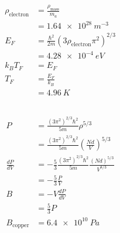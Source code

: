 \documentclass{article}
\begin{document}
\begin{align*}
  \rho_\text{electron} & = \frac{\rho_\text{mass}}{m_a}                               \\
                       & = \qty{1.64e28}{m^{-3}}                                      \\
  E_F                  & = \frac{\hbar^2}{2 m} (3 \rho_\text{electron} \pi^2)^{2 / 3} \\
                       & = \qty{4.28e-4}{eV}                                          \\
  k_B T_F              & = E_F                                                        \\
  T_F                  & = \frac{E_F}{k_B}                                            \\
                       & = \qty{4.96}{K}
\end{align*}

\subsection{}

\begin{align*}
  P               & = \frac{(3 \pi^2)^{2 / 3} \hbar^2}{5 m} \rho^{5 / 3}                                 \\
                  & = \frac{(3 \pi^2)^{2 / 3} \hbar^2}{5 m} \left( \frac{N d}{V} \right)^{5 / 3}         \\
  \frac{d P}{d V} & = -\frac{5}{3} \frac{(3 \pi^2)^{2 / 3} \hbar^2}{5 m} \frac{(N d)^{5 / 3}}{V^{8 / 3}} \\
                  & = -\frac{5}{3} \frac{P}{V}                                                           \\
  B               & = -V \frac{d P}{d V}                                                                 \\
                  & = \frac{5}{3} P                                                                      \\
  B_\text{copper} & = \qty{6.4e10}{Pa}
\end{align*}

\subsection{}
\end{document}
